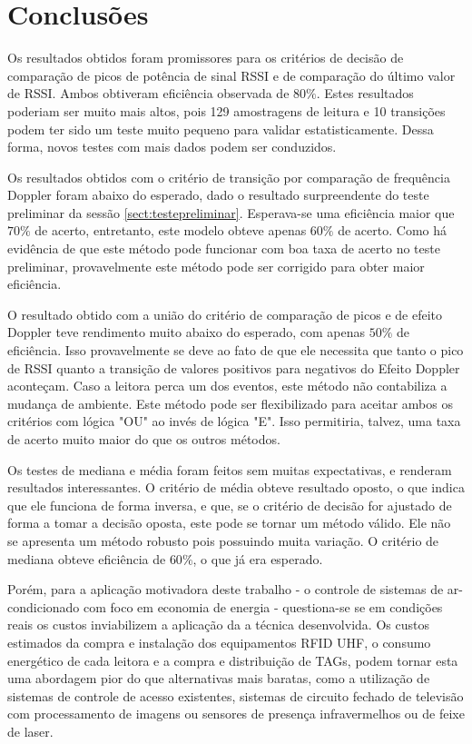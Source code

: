 
\chapter{Conclusões} \label{chap:Conclusao}

\label{CapConclusoes}

Os resultados obtidos foram promissores para os critérios de decisão de comparação de picos de potência de sinal RSSI e de comparação do último valor de RSSI. Ambos obtiveram eficiência observada de $80\%$. Estes resultados poderiam ser muito mais altos, pois 129 amostragens de leitura e 10 transições podem ter sido um teste muito pequeno para validar estatisticamente. Dessa forma, novos testes com mais dados podem ser conduzidos.

Os resultados obtidos com o critério de transição por comparação de frequência Doppler foram abaixo do esperado, dado o resultado surpreendente do teste preliminar da sessão \ref{sect:testepreliminar}. Esperava-se uma eficiência maior que $70\%$ de acerto, entretanto, este modelo obteve apenas $60\%$ de acerto. Como há evidência de que este método pode funcionar com boa taxa de acerto no teste preliminar, provavelmente este método pode ser corrigido para obter maior eficiência.

O resultado obtido com a união do critério de comparação de picos e de efeito Doppler teve rendimento muito abaixo do esperado, com apenas $50\%$ de eficiência. Isso provavelmente se deve ao fato de que ele necessita que tanto o pico de RSSI quanto a transição de valores positivos para negativos do Efeito Doppler aconteçam. Caso a leitora perca um dos eventos, este método não contabiliza a mudança de ambiente. Este método pode ser flexibilizado para aceitar ambos os critérios com lógica "OU" ao invés de lógica "E". Isso permitiria, talvez, uma taxa de acerto muito maior do que os outros métodos.

Os testes de mediana e média foram feitos sem muitas expectativas, e renderam resultados interessantes. O critério de média obteve resultado oposto, o que indica que ele funciona de forma inversa, e que, se o critério de decisão for ajustado de forma a tomar a decisão oposta, este pode se tornar um método válido. Ele não se apresenta um método robusto pois possuindo muita variação. O critério de mediana obteve eficiência de $60\%$, o que já era esperado.

Porém, para a aplicação motivadora deste trabalho - o controle de sistemas de ar-condicionado com foco em economia de energia - questiona-se se em condições reais os custos inviabilizem a aplicação da a técnica desenvolvida. Os custos estimados da compra e instalação dos equipamentos RFID UHF, o consumo energético de cada leitora e a compra e distribuição de TAGs, podem tornar esta uma abordagem pior do que alternativas mais baratas, como a utilização de sistemas de controle de acesso existentes, sistemas de circuito fechado de televisão com processamento de imagens ou sensores de presença infravermelhos ou de feixe de laser.

